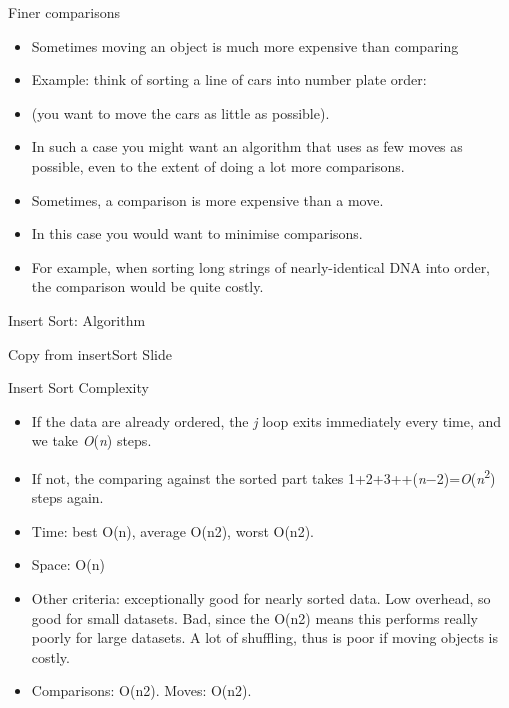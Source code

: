 \documentclass{beamer}
\begin{document}
\begin{frame}

Finer comparisons

\begin{itemize}
\item Sometimes moving an object is much more expensive than comparing
\item Example: think of sorting a line of cars into number plate order: 
\item (you want to move the cars as little as possible).
\item In such a case you might want an algorithm that uses as few moves as possible, even to the extent of doing a lot
more comparisons.
\item Sometimes, a comparison is more expensive than a move. 
\item In this case you would want to minimise comparisons.
\item For example, when sorting long strings of nearly-identical DNA into order, the comparison would be quite costly.
\end{itemize}
\end{frame} \begin{frame}

Insert Sort: Algorithm

Copy from insertSort Slide

\end{frame} \begin{frame}

Insert Sort Complexity

\begin{itemize}
\item If the data are already ordered, the \textit{j }loop exits immediately every time, and we take
\textit{O}(\textit{n}) steps.
\item If not, the comparing against the sorted part takes
1+2+3+{\textperiodcentered}{\textperiodcentered}{\textperiodcentered}+(\textit{n}$-$2)=\textit{O}(\textit{n}\textsuperscript{2})
steps again.
\item Time: best O(n), average O(n2), worst O(n2). 
\item Space: O(n)
\item Other criteria: exceptionally good for nearly sorted data. Low overhead, so good for small datasets. Bad, since
the O(n2) means this performs really poorly for large datasets. A lot of shuffling, thus is poor if moving objects is
costly.
\item Comparisons: O(n2). Moves: O(n2).
\end{itemize} 


\end{frame}
\end{document}
